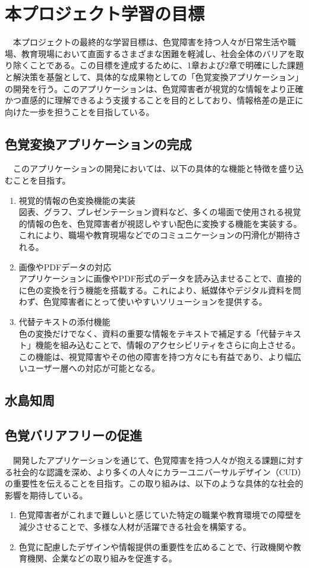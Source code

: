 \chapter{本プロジェクト学習の目標}
　本プロジェクトの最終的な学習目標は、色覚障害を持つ人々が日常生活や職場、教育現場において直面するさまざまな困難を軽減し、社会全体のバリアを取り除くことである。この目標を達成するために、1章および2章で明確にした課題と解決策を基盤として、具体的な成果物としての「色覚変換アプリケーション」の開発を行う。このアプリケーションは、色覚障害者が視覚的な情報をより正確かつ直感的に理解できるよう支援することを目的としており、情報格差の是正に向けた一歩を担うことを目指している。
\section{色覚変換アプリケーションの完成}
　このアプリケーションの開発においては、以下の具体的な機能と特徴を盛り込むことを目指す。
\begin{enumerate}
  \item 視覚的情報の色変換機能の実装\\
  図表、グラフ、プレゼンテーション資料など、多くの場面で使用される視覚的情報の色を、色覚障害者が視認しやすい配色に変換する機能を実装する。これにより、職場や教育現場などでのコミュニケーションの円滑化が期待される。\\
  \item 画像やPDFデータの対応\\
  アプリケーションに画像やPDF形式のデータを読み込ませることで、直接的に色の変換を行う機能を搭載する。これにより、紙媒体やデジタル資料を問わず、色覚障害者にとって使いやすいソリューションを提供する。\\
  \item 代替テキストの添付機能\\
  色の変換だけでなく、資料の重要な情報をテキストで補足する「代替テキスト」機能を組み込むことで、情報のアクセシビリティをさらに向上させる。この機能は、視覚障害やその他の障害を持つ方々にも有益であり、より幅広いユーザー層への対応が可能となる。
\end{enumerate}
\section{水島知周}
\section{色覚バリアフリーの促進}
　開発したアプリケーションを通じて、色覚障害を持つ人々が抱える課題に対する社会的な認識を深め、より多くの人々にカラーユニバーサルデザイン（CUD）の重要性を伝えることを目指す。この取り組みは、以下のような具体的な社会的影響を期待している。
\begin{enumerate}
  \item 色覚障害者がこれまで難しいと感じていた特定の職業や教育環境での障壁を減少させることで、多様な人材が活躍できる社会を構築する。
  \item 色覚に配慮したデザインや情報提供の重要性を広めることで、行政機関や教育機関、企業などの取り組みを促進する。
\end{enumerate}
